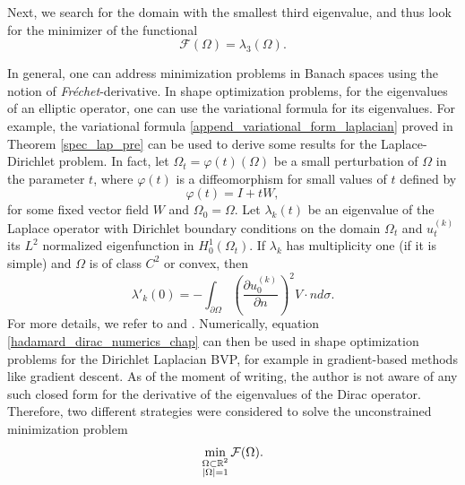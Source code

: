Next, we search for the domain with the smallest third eigenvalue, and thus look for the minimizer of the functional
\begin{equation*}%
    \mathcal{F}(\Omega) = \lambda_3(\Omega).
\end{equation*}

In general, one can address minimization problems in Banach spaces using the notion of \textit{Fréchet}-derivative. In shape optimization problems, for the eigenvalues of an elliptic operator, one can use the variational formula for its eigenvalues. For example, the variational formula \eqref{append_variational_form_laplacian} proved in Theorem \ref{spec_lap_pre} can be used to derive some results for the Laplace-Dirichlet problem. In fact, let \(\Omega_t = \varphi(t)(\Omega)\) be a small perturbation of \(\Omega\) in the parameter \(t\), where \(\varphi(t)\) is a diffeomorphism for small values of \(t\) defined by
\begin{equation}\label{dirac_perturbation_chapter_5}
    \varphi(t) = I + t W,
\end{equation}
for some fixed vector field \(W\) and \(\Omega_0 = \Omega\). Let  \(\lambda_k(t)\) be an eigenvalue of the Laplace operator with Dirichlet boundary conditions on the domain \(\Omega_t\) and \(u^{(k)}_t\) its \(L^2\) normalized eigenfunction in \(H^1_0(\Omega_t)\). If \(\lambda_k\) has multiplicity one (if it is simple) and \(\Omega\) is of class \(C^2\) or convex, then
\begin{equation}\label{hadamard_dirac_numerics_chap}
    \lambda'_k(0) =- \int_{\partial\Omega} \left(\frac{\partial u^{(k)}_0}{\partial n}\right)^2 V\cdot n d \sigma.
\end{equation}
For more details, we refer to \cite{henrot2006extremum} and \cite{kato2013perturbation}. Numerically, equation \eqref{hadamard_dirac_numerics_chap} can then be used in shape optimization problems for the Dirichlet Laplacian \ac{BVP}, for example in gradient-based methods like gradient descent.
As of the moment of writing, the author is not aware of any such closed form for the derivative of the eigenvalues of the Dirac operator. Therefore, two different strategies were considered to solve the unconstrained minimization problem
\begin{equation}\label{dirac_unconstrained_min_lambda_3}
    \min_{\substack{\Omega \subset \mathbb{R}^2 \\ \abs{\Omega}=1}} \mathcal{F}(\Omega).
\end{equation}

